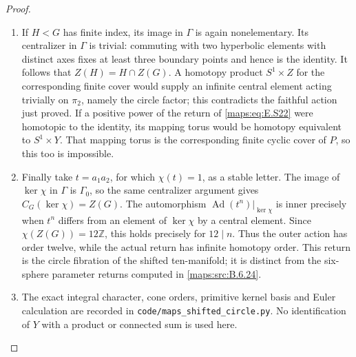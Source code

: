 \begin{proof}
\begin{enumerate}[label=\arabic*.,leftmargin=*]
\item If $H<G$ has finite index, its image in $\Gamma$ is again
nonelementary. Its centralizer in $\Gamma$ is trivial:
commuting with two hyperbolic elements with distinct axes
fixes at least three boundary points and hence is the
identity. It follows that
$Z(H)=H\cap Z(G)$. A homotopy product $S^1\times Z$ for
the corresponding finite cover would supply an infinite
central element acting trivially on $\pi_2$, namely the
circle factor; this contradicts the faithful action just
proved. If a positive power of the return of \eqref{maps:eq:E.S22} were
homotopic to the identity, its mapping torus would be
homotopy equivalent to $S^1\times Y$. That mapping torus
is the corresponding finite cyclic cover of $P$, so this
too is impossible.

\item Finally take $t=a_1a_2$, for which $\chi(t)=1$, as a
stable letter. The image of $\ker\chi$ in $\Gamma$ is
$\Gamma_0$, so the same centralizer argument gives
$C_G(\ker\chi)=Z(G)$. The automorphism
$\operatorname{Ad}(t^n)|_{\ker\chi}$ is inner precisely
when $t^n$ differs from an element of $\ker\chi$ by a
central element. Since $\chi(Z(G))=12\mathbb Z$, this
holds precisely for $12\mid n$. Thus the outer action has
order twelve, while the actual return has infinite homotopy
order. This return is the circle fibration of the shifted
ten-manifold; it is distinct from the six-sphere parameter
returns computed in \ref{maps:src:B.6.24}.

\item The exact integral character, cone orders, primitive kernel
basis and Euler calculation are recorded in
\texttt{code/maps\_shifted\_circle.py}. No identification
of $Y$ with a product or connected sum is used here.
\end{enumerate}
\end{proof}


